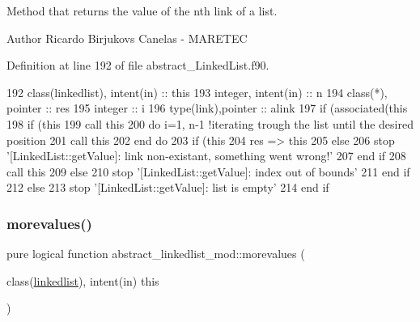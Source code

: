 Method that returns the value of the nth link of a list. 

\begin{DoxyAuthor}{Author}
Ricardo Birjukovs Canelas -\/ M\+A\+R\+E\+T\+EC 
\end{DoxyAuthor}


Definition at line 192 of file abstract\+\_\+\+Linked\+List.\+f90.


\begin{DoxyCode}
192     \textcolor{keywordtype}{class}(linkedlist), \textcolor{keywordtype}{intent(in)} :: this
193     \textcolor{keywordtype}{integer}, \textcolor{keywordtype}{intent(in)} :: n
194     \textcolor{keywordtype}{class}(*), \textcolor{keywordtype}{pointer} :: res
195     \textcolor{keywordtype}{integer} :: i
196     \textcolor{keywordtype}{type}(link),\textcolor{keywordtype}{pointer} :: alink
197     \textcolor{keywordflow}{if} (\textcolor{keyword}{associated}(this%
198         \textcolor{keywordflow}{if} (this%
199             \textcolor{keyword}{call }this%
200             \textcolor{keywordflow}{do} i=1, n-1    \textcolor{comment}{!iterating trough the list until the desired position            }
201                 \textcolor{keyword}{call }this%
202 \textcolor{keywordflow}{            end do}
203             \textcolor{keywordflow}{if} (this%
204             res => this%
205             \textcolor{keywordflow}{else}
206                 stop \textcolor{stringliteral}{'[LinkedList::getValue]: link non-existant, something went wrong!'}
207 \textcolor{keywordflow}{            end if}
208             \textcolor{keyword}{call }this%
209         \textcolor{keywordflow}{else}
210             stop \textcolor{stringliteral}{'[LinkedList::getValue]: index out of bounds'}
211 \textcolor{keywordflow}{        end if}
212     \textcolor{keywordflow}{else}
213         stop \textcolor{stringliteral}{'[LinkedList::getValue]: list is empty'}
214 \textcolor{keywordflow}{    end if}
\end{DoxyCode}
\mbox{\label{namespaceabstract__linkedlist__mod_a91ec7f6e570a87769ebb3d11b33f577e}} 
\subsubsection{\texorpdfstring{morevalues()}{morevalues()}}
{\footnotesize\ttfamily pure logical function abstract\+\_\+linkedlist\+\_\+mod\+::morevalues (\begin{DoxyParamCaption}\item[{class(\mbox{\hyperlink{structabstract__linkedlist__mod_1_1linkedlist}{linkedlist}}), intent(in)}]{this }\end{DoxyParamCaption})\hspace{0.3cm}{\ttfamily [private]}}



